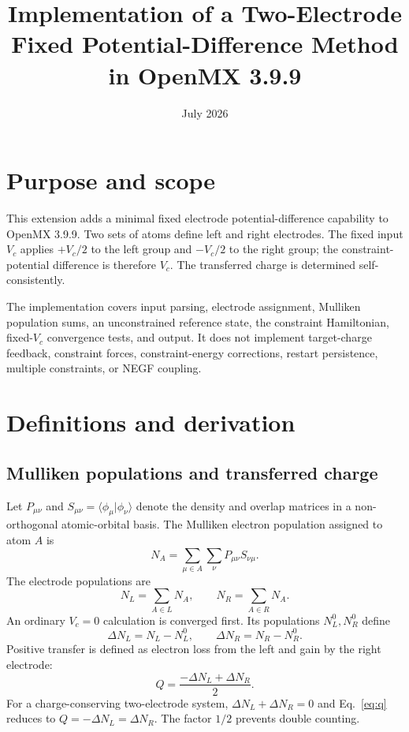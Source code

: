 \documentclass[11pt,a4paper]{article}
\title{Implementation of a Two-Electrode Fixed Potential-Difference Method\\
in OpenMX 3.9.9}
\author{}
\date{July 2026}
\begin{document}
\maketitle
\tableofcontents

\section{Purpose and scope}

This extension adds a minimal fixed electrode potential-difference capability
to OpenMX 3.9.9. Two sets of atoms define left and right electrodes. The fixed
input $V_c$ applies $+V_c/2$ to the left group and $-V_c/2$ to the right group;
the constraint-potential difference is therefore $V_c$. The transferred
charge is determined self-consistently.

The implementation covers input parsing, electrode assignment, Mulliken
population sums, an unconstrained reference state, the constraint
Hamiltonian, fixed-$V_c$ convergence tests, and output. It does not implement
target-charge feedback, constraint forces, constraint-energy
corrections, restart persistence, multiple constraints, or NEGF coupling.

\section{Definitions and derivation}

\subsection{Mulliken populations and transferred charge}

Let $P_{\mu\nu}$ and
$S_{\mu\nu}=\langle\phi_\mu|\phi_\nu\rangle$ denote the density and overlap
matrices in a non-orthogonal atomic-orbital basis. The Mulliken electron
population assigned to atom $A$ is
\begin{equation}
 N_A=\sum_{\mu\in A}\sum_\nu P_{\mu\nu}S_{\nu\mu}.
\end{equation}
The electrode populations are
\begin{equation}
 N_L=\sum_{A\in L}N_A,\qquad N_R=\sum_{A\in R}N_A.
\end{equation}
An ordinary $V_c=0$ calculation is converged first. Its populations
$N_L^0,N_R^0$ define
\begin{equation}
 \Delta N_L=N_L-N_L^0,\qquad \Delta N_R=N_R-N_R^0.
\end{equation}
Positive transfer is defined as electron loss from the left and gain by the
right electrode:
\begin{equation}
 Q=\frac{-\Delta N_L+\Delta N_R}{2}.
 \label{eq:q}
\end{equation}
For a charge-conserving two-electrode system,
$\Delta N_L+\Delta N_R=0$ and Eq.~\eqref{eq:q} reduces to
$Q=-\Delta N_L=\Delta N_R$. The factor $1/2$ prevents double counting.
\end{document}
